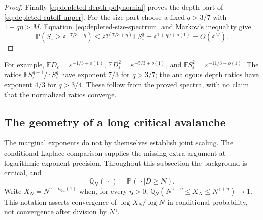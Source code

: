 \documentclass[11pt]{article}
\numberwithin{equation}{section}
\theoremstyle{definition}
\newcommand{\E}{\mathbb E}
\newcommand{\Prob}{\mathbb P}
\begin{document}
\begin{proof}
Finally \eqref{eq:depleted-depth-polynomial} proves the depth part of \eqref{eq:depleted-cutoff-upper}. For the size part choose a fixed $q>3/7$ with $1+q\eta>M$. Equation~\eqref{eq:depleted-size-spectrum} and Markov's inequality give
\[
 \Prob(S_\varepsilon\ge\varepsilon^{-7/3-\eta})
 \le\varepsilon^{q(7/3+\eta)}\E S_\varepsilon^q
 =\varepsilon^{1+q\eta+o(1)}=O(\varepsilon^M).
\]
\end{proof}
For example, $\E D_\varepsilon=\varepsilon^{-1/3+o(1)}$, $\E D_\varepsilon^2=\varepsilon^{-5/3+o(1)}$, and $\E S_\varepsilon^2=\varepsilon^{-11/3+o(1)}$. The ratios $\E S_\varepsilon^{q+1}/\E S_\varepsilon^q$ have exponent $7/3$ for $q>3/7$; the analogous depth ratios have exponent $4/3$ for $q>3/4$. These follow from the proved spectra, with no claim that the normalized ratios converge.

\subsection{The geometry of a long critical avalanche}\label{sec:conditional-geometry}
The marginal exponents do not by themselves establish joint scaling. The conditional Laplace comparison supplies the missing extra argument at logarithmic-exponent precision. Throughout this subsection the background is critical, and
\[
 \mathbb Q_N(\,\cdot\,)=\Prob(\,\cdot\mid D\ge N).
\]
Write $X_N=N^{\gamma+o_{\mathbb Q_N}(1)}$ when, for every $\eta>0$, $\mathbb Q_N(N^{\gamma-\eta}\le X_N\le N^{\gamma+\eta})\to1$. This notation asserts convergence of $\log X_N/\log N$ in conditional probability, not convergence after division by $N^\gamma$.
\end{document}
